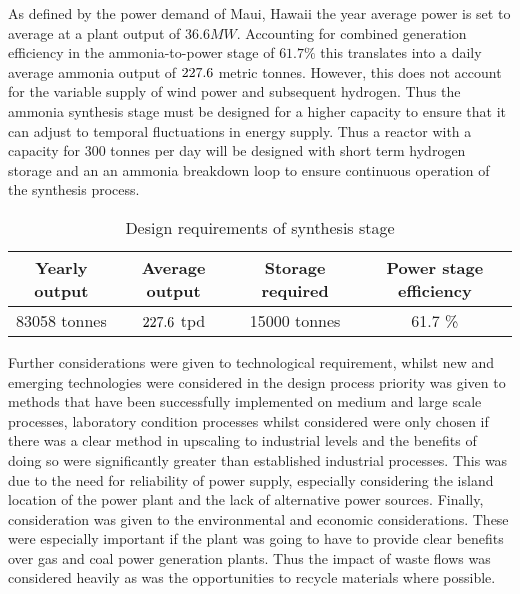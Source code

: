 As defined by the power demand of Maui, Hawaii the year average power is set to average at a plant output of $36.6MW$. Accounting for combined generation efficiency in the ammonia-to-power stage of $61.7\%$ this translates into a daily average ammonia output of $227.6$ metric tonnes. However, this does not account for the variable supply of wind power and subsequent hydrogen. Thus the ammonia synthesis stage must be designed for a higher capacity to ensure that it can adjust to temporal fluctuations in energy supply. Thus a reactor with a capacity for $300$ tonnes per day will be designed with short term hydrogen storage and an an ammonia breakdown loop to ensure continuous operation of the synthesis process. 
\begin{table}[!htbp]
	\begin{center}
		\label{req}
		\caption{Design requirements of synthesis stage}
		
		\begin{tabular}{|c|c|c|c|}
			\hline
			Yearly output& Average output & Storage required & Power stage efficiency     \\ \hline
			83058 tonnes            & $227.6 $  tpd            & 15000 tonnes                          & 61.7 \%  \\ \hline
		\end{tabular}
		
	\end{center}
\end{table}


Further considerations were given to technological requirement, whilst new and emerging technologies were considered in the design process priority was given to methods that have been successfully implemented on medium and large scale processes, laboratory condition processes whilst considered were only chosen if there was a clear method in upscaling to industrial levels and the benefits of doing so were significantly greater than established industrial processes. This was due to the need for reliability of power supply, especially considering the island location of the power plant and the lack of alternative power sources.
Finally, consideration was given to the environmental and economic considerations. These were especially important if the plant was going to have to provide clear benefits over gas and coal power generation plants. Thus the impact of waste flows was considered heavily as was the opportunities to recycle materials where possible. 



